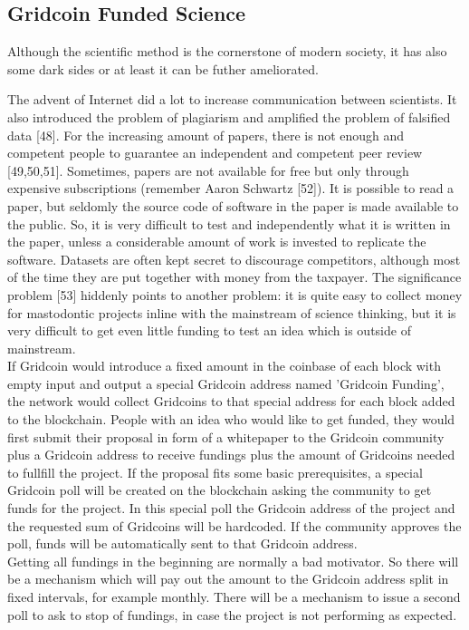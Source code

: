 \subsection{Gridcoin Funded Science}

Although the scientific method is the cornerstone of modern society, it has also some dark sides or at least it can be futher ameliorated. 

The advent of Internet did a lot to increase communication between scientists. It also introduced the problem of plagiarism and amplified the problem of falsified data [48]. For the increasing amount of papers, there is not enough and competent people to guarantee an independent and competent peer review [49,50,51]. Sometimes, papers are not available for free but only through expensive subscriptions (remember Aaron Schwartz [52]). It is possible to read a paper, but seldomly the source code of software in the paper is made available to the public. So, it is very difficult to test and independently what it is written in the paper, unless a considerable amount of work is invested to replicate the software. Datasets are often kept secret to discourage competitors, although most of the time they are put together with money from the taxpayer. The significance problem [53] hiddenly points to another problem: it is quite easy to collect money for mastodontic projects inline with the mainstream of science thinking, but it is very difficult to get even little funding to test an idea which is outside of mainstream.\\

If Gridcoin would introduce a fixed amount in the coinbase of each block with empty input and output a special Gridcoin address named 'Gridcoin Funding', the network would collect Gridcoins to that special address for each block added to the blockchain. People with an idea who would like to get funded, they would first submit their proposal in form of a whitepaper to the Gridcoin community plus a Gridcoin address to receive fundings plus the amount of Gridcoins needed to fullfill the project. If the proposal fits some basic prerequisites, a special Gridcoin poll will be created on the blockchain asking the community to get funds for the project. In this special poll the Gridcoin address of the project and the requested sum of Gridcoins will be hardcoded. If the community approves the poll, funds will be automatically sent to that Gridcoin address.\\

Getting all fundings in the beginning are normally a bad motivator. So there will be a mechanism which will pay out the amount to the Gridcoin address split in fixed intervals, for example monthly. There will be a mechanism to issue a second poll to ask to stop of fundings, in case the project is not performing as expected.\\

